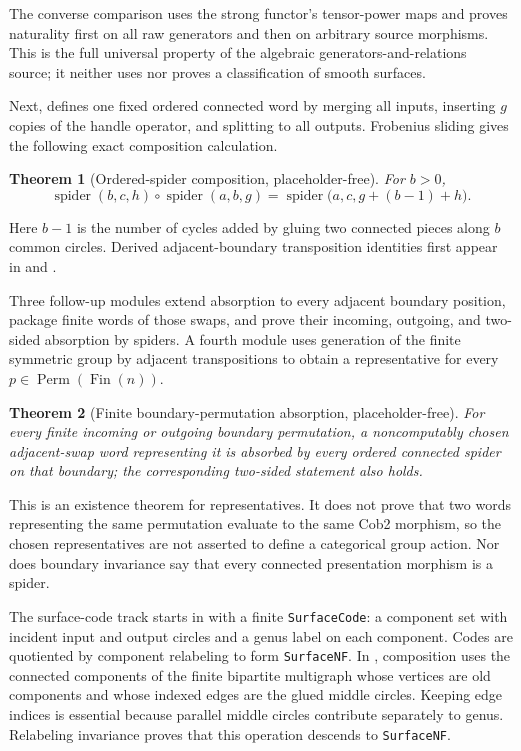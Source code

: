 \documentclass[11pt]{amsart}
\theoremstyle{plain}
\newtheorem{theorem}{Theorem}[section]
\theoremstyle{definition}
\begin{document}
The converse comparison uses the strong functor's tensor-power maps and proves naturality first on all raw generators and then on arbitrary source morphisms. This is the full universal property of the algebraic generators-and-relations source; it neither uses nor proves a classification of smooth surfaces.

Next,  defines one fixed ordered connected word by merging all inputs, inserting $g$ copies of the handle operator, and splitting to all outputs. Frobenius sliding gives the following exact composition calculation.

\begin{theorem}[Ordered-spider composition, placeholder-free]
For $b>0$,
\[
\operatorname{spider}(b,c,h)\circ
\operatorname{spider}(a,b,g)
=
\operatorname{spider}\bigl(a,c,g+(b-1)+h\bigr).
\]
\end{theorem}

Here $b-1$ is the number of cycles added by gluing two connected pieces along $b$ common circles. Derived adjacent-boundary transposition identities first appear in  and .

Three follow-up modules extend absorption to every adjacent boundary position, package finite words of those swaps, and prove their incoming, outgoing, and two-sided absorption by spiders. A fourth module uses generation of the finite symmetric group by adjacent transpositions to obtain a representative for every $p\in\operatorname{Perm}(\operatorname{Fin}(n))$.

\begin{theorem}[Finite boundary-permutation absorption, placeholder-free]
For every finite incoming or outgoing boundary permutation, a noncomputably chosen adjacent-swap word representing it is absorbed by every ordered connected spider on that boundary; the corresponding two-sided statement also holds.
\end{theorem}

This is an existence theorem for representatives. It does not prove that two words representing the same permutation evaluate to the same Cob2 morphism, so the chosen representatives are not asserted to define a categorical group action. Nor does boundary invariance say that every connected presentation morphism is a spider.

The surface-code track starts in  with a finite \texttt{SurfaceCode}: a component set with incident input and output circles and a genus label on each component. Codes are quotiented by component relabeling to form \texttt{SurfaceNF}. In , composition uses the connected components of the finite bipartite multigraph whose vertices are old components and whose indexed edges are the glued middle circles. Keeping edge indices is essential because parallel middle circles contribute separately to genus. Relabeling invariance proves that this operation descends to \texttt{SurfaceNF}.
\end{document}
